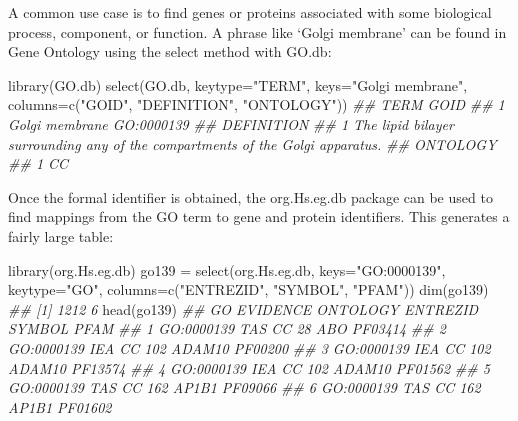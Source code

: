 \documentclass[]{article}
\newcommand{\hlstr}[1]{\textcolor[rgb]{0.251,0.627,0.251}{#1}}%
\newcommand{\hlcom}[1]{\textcolor[rgb]{0.502,0.502,0.502}{\textit{#1}}}%
\newcommand{\hlstd}[1]{\textcolor[rgb]{0.251,0.251,0.251}{#1}}%
\newcommand{\hlkwc}[1]{\textcolor[rgb]{0.251,0.251,0.251}{#1}}%
\newcommand{\hlkwd}[1]{\textcolor[rgb]{0.878,0.439,0.125}{#1}}%
\newenvironment{Shaded}{\begin{myshaded}}{\end{myshaded}}
\newcommand{\KeywordTok}[1]{\hlkwd{#1}}
\newcommand{\DataTypeTok}[1]{\hlkwc{#1}}
\newcommand{\StringTok}[1]{\hlstr{#1}}
\newcommand{\CommentTok}[1]{\hlcom{#1}}
\newcommand{\NormalTok}[1]{\hlstd{#1}}
\begin{document}
A common use case is to find genes or proteins associated
with some biological process, component, or function.
A phrase like `Golgi membrane' can be found in Gene Ontology
using the select method with GO.db:

\begin{Shaded}
\begin{Highlighting}[]
\KeywordTok{library}\NormalTok{(GO.db)}
\KeywordTok{select}\NormalTok{(GO.db, }\DataTypeTok{keytype=}\StringTok{"TERM"}\NormalTok{,}
   \DataTypeTok{keys=}\StringTok{"Golgi membrane"}\NormalTok{, }\DataTypeTok{columns=}\KeywordTok{c}\NormalTok{(}\StringTok{"GOID"}\NormalTok{, }\StringTok{"DEFINITION"}\NormalTok{, }\StringTok{"ONTOLOGY"}\NormalTok{))}
\CommentTok{\#\#             TERM       GOID}
\CommentTok{\#\# 1 Golgi membrane GO:0000139}
\CommentTok{\#\#                                                                      DEFINITION}
\CommentTok{\#\# 1 The lipid bilayer surrounding any of the compartments of the Golgi apparatus.}
\CommentTok{\#\#   ONTOLOGY}
\CommentTok{\#\# 1       CC}
\end{Highlighting}
\end{Shaded}

Once the formal identifier is obtained, the org.Hs.eg.db package
can be used to find mappings from the GO term to gene and protein
identifiers. This generates a fairly large table:

\begin{Shaded}
\begin{Highlighting}[]
\KeywordTok{library}\NormalTok{(org.Hs.eg.db)}
\NormalTok{go139 =}\StringTok{ }\KeywordTok{select}\NormalTok{(org.Hs.eg.db, }\DataTypeTok{keys=}\StringTok{"GO:0000139"}\NormalTok{, }\DataTypeTok{keytype=}\StringTok{"GO"}\NormalTok{,}
   \DataTypeTok{columns=}\KeywordTok{c}\NormalTok{(}\StringTok{"ENTREZID"}\NormalTok{, }\StringTok{"SYMBOL"}\NormalTok{, }\StringTok{"PFAM"}\NormalTok{))}
\KeywordTok{dim}\NormalTok{(go139)}
\CommentTok{\#\# [1] 1212    6}
\KeywordTok{head}\NormalTok{(go139)}
\CommentTok{\#\#           GO EVIDENCE ONTOLOGY ENTREZID SYMBOL    PFAM}
\CommentTok{\#\# 1 GO:0000139      TAS       CC       28    ABO PF03414}
\CommentTok{\#\# 2 GO:0000139      IEA       CC      102 ADAM10 PF00200}
\CommentTok{\#\# 3 GO:0000139      IEA       CC      102 ADAM10 PF13574}
\CommentTok{\#\# 4 GO:0000139      IEA       CC      102 ADAM10 PF01562}
\CommentTok{\#\# 5 GO:0000139      TAS       CC      162  AP1B1 PF09066}
\CommentTok{\#\# 6 GO:0000139      TAS       CC      162  AP1B1 PF01602}
\end{Highlighting}
\end{Shaded}
\end{document}
